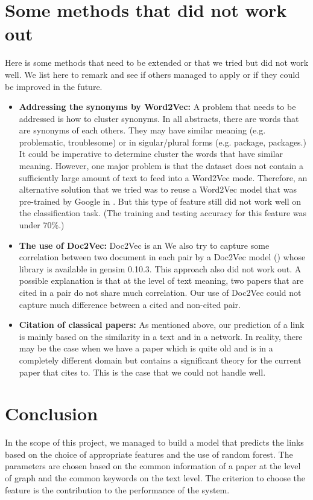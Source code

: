 \documentclass{article}
\begin{document}
\section{Some methods that did not work out}
Here is some methods that need to be extended or that we tried but did not work well. We list here to remark and see if others managed to apply or if they could be improved in the future.
\begin{itemize}
\item \textbf{Addressing the synonyms by Word2Vec:} A problem that needs to be addressed is how to cluster synonyms. In all abstracts, there are words that are synonyms of each others. They may have similar meaning (e.g. problematic, troublesome) or in sigular/plural forms (e.g. package, packages.) It could be imperative to determine cluster the words that have similar meaning. However, one major problem is that the dataset does not contain a sufficiently large amount of text to feed into a Word2Vec mode. Therefore, an alternative solution that we tried was to reuse a Word2Vec model that was pre-trained by Google in \cite{word2vecgg}. But this type of feature still did not work well on the classification task. (The training and testing accuracy for this feature was under 70$\%$.)
\item \textbf{The use of Doc2Vec:} Doc2Vec is an  We also try to capture some correlation between two document in each pair by a Doc2Vec model (\cite{DBLP:LeM14}) whose library is available in gensim 0.10.3. This approach also did not work out. A possible explanation is that at the level of text meaning, two papers that are cited in a pair do not share much correlation. Our use of Doc2Vec could not capture much difference between a cited and non-cited pair.
\item \textbf{Citation of classical papers:} As mentioned above, our prediction of a link is mainly based on the similarity in a text and in a network. In reality, there may be the case when we have a paper which is quite old and is in a completely different domain but contains a significant theory for the current paper that cites to. This is the case that we could not handle well.
\end{itemize}

\section{Conclusion}

In the scope of this project, we managed to build a model that predicts the links based on the choice of appropriate features and the use of random forest. The parameters are chosen based on the common information of a paper at the level of graph and the common keywords on the text level. The criterion to choose the feature is the contribution to the performance of the system.



\end{document}
